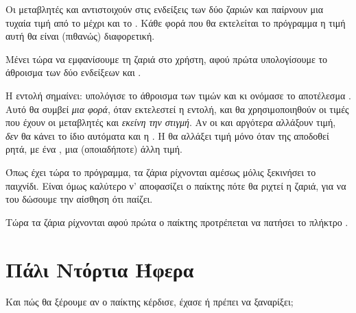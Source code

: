 \documentclass[a4paper,11pt,oneside]{book}
\begin{document}
\clearpage
Οι μεταβλητές  και  αντιστοιχούν στις ενδείξεις των δύο ζαριών και παίρνουν μια τυχαία τιμή από το  μέχρι και το . Κάθε φορά που θα εκτελείται το πρόγραμμα η τιμή αυτή θα είναι (πιθανώς) διαφορετική.

Μένει τώρα να εμφανίσουμε τη ζαριά στο χρήστη, αφού πρώτα υπολογίσουμε το άθροισμα των δύο ενδείξεων  και .


Η εντολή  σημαίνει: υπολόγισε το άθροισμα των τιμών  και  κι ονόμασε το αποτέλεσμα . Αυτό θα συμβεί \emph{μια φορά}, όταν εκτελεστεί η εντολή, και θα χρησιμοποιηθούν οι τιμές που έχουν οι μεταβλητές  και  \emph{εκείνη την στιγμή}. 
Αν οι  και  αργότερα αλλάξουν τιμή, \emph{δεν} θα κάνει το ίδιο αυτόματα και η . Η  θα αλλάξει τιμή μόνο όταν της αποδοθεί ρητά, με ένα \pyinline{=}, μια (οποιαδήποτε) άλλη τιμή. 

Όπως έχει τώρα το πρόγραμμα, τα ζάρια ρίχνονται αμέσως μόλις
ξεκινήσει το παιχνίδι. Είναι όμως καλύτερο ν’ αποφασίζει ο παίκτης
πότε θα ριχτεί η ζαριά, για να του δώσουμε την αίσθηση ότι παίζει.


Τώρα τα ζάρια ρίχνονται αφού πρώτα ο παίκτης προτρέπεται να πατήσει το πλήκτρο .


\section{Πάλι Ντόρτια Ήφερα}

\begin{question}
Και πώς θα ξέρουμε αν ο παίκτης κέρδισε, έχασε ή πρέπει να ξαναρίξει;
\end{question}
\end{document}
